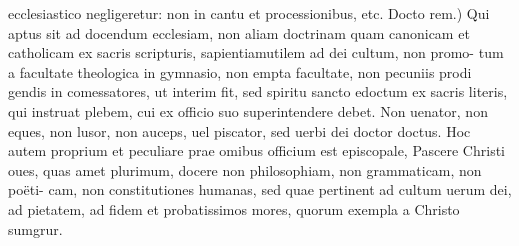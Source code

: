\documentclass{article}
\begin{document}
\begin{pages}
ecclesiastico negligeretur: non in cantu et processionibus, etc. Docto rem.) Qui aptus sit ad docendum ecclesiam, non aliam doctrinam quam canonicam et catholicam ex sacris scripturis, sapientiamutilem ad dei cultum, non promo- tum a facultate theologica in gymnasio, non empta facultate, non pecuniis prodi gendis in comessatores, ut interim fit, sed spiritu sancto edoctum ex sacris literis, qui instruat plebem, cui ex officio suo superintendere debet. Non uenator, non eques, non lusor, non auceps, uel piscator, sed uerbi dei doctor doctus. Hoc autem proprium et peculiare prae omibus officium est episcopale, Pascere Christi oues, quas amet plurimum, docere non philosophiam, non grammaticam, non poëti- cam, non constitutiones humanas, sed quae pertinent ad cultum uerum dei, ad pietatem, ad fidem et probatissimos mores, quorum exempla a Christo sumgrur.  \pend

\end{pages}
\end{document}

